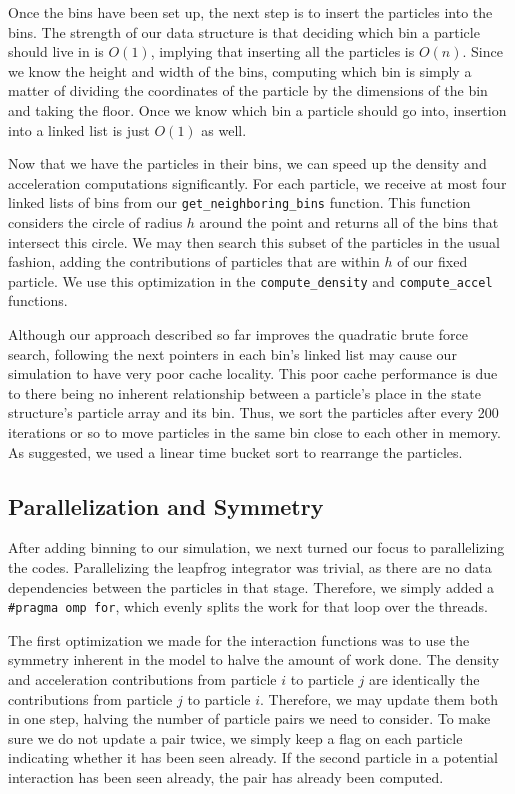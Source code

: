 \message{ !name(writeup.tex)}\documentclass[12pt]{article}
\def\ind{\vspace{0.75em}\noindent}
\begin{document}
\ind Once the bins have been set up, the next step is to insert the particles
into the bins. The strength of our data structure is that deciding which
bin a particle should live in is $O(1)$, implying that inserting all
the particles is $O(n)$. Since we know the height and width of the
bins, computing which bin is simply a matter of dividing the coordinates
of the particle by the dimensions of the bin and taking the floor.
Once we know which bin a particle should go into, insertion into a
linked list is just $O(1)$ as well.

\ind Now that we have the particles in their bins, we can speed up the
density and acceleration computations significantly. For each particle,
we receive at most four linked lists of bins from our {\tt get\_neighboring\_bins}
function. This function considers the circle of radius $h$ around the
point and returns all of the bins that intersect this circle. We
may then search this subset of the particles in the usual fashion,
adding the contributions of particles that are within $h$ of our
fixed particle. We use this optimization in the {\tt compute\_density}
and {\tt compute\_accel} functions.

\ind Although our approach described so far improves the quadratic
brute force search, following the next pointers in each bin's
linked list may cause our simulation to have very poor cache
locality. This poor cache performance is due to there being no
inherent relationship between a particle's place in the state structure's
particle array and its bin. Thus, we sort the particles after every
200 iterations or so to move particles in the same bin close to each
other in memory. As suggested, we used a linear time bucket
sort to rearrange the particles.

\subsection*{Parallelization and Symmetry}
After adding binning to our simulation, we next turned our focus to
parallelizing the codes. Parallelizing the leapfrog integrator was
trivial, as there are no data dependencies between the particles
in that stage. Therefore, we simply added a {\tt \#pragma omp for},
which evenly splits the work for that loop over the threads.

\ind The first optimization we made for the interaction functions
was to use the symmetry inherent in the model to halve the amount
of work done. The density and acceleration contributions from particle
$i$ to particle $j$ are identically the contributions from particle
$j$ to particle $i$. Therefore, we may update them both in
one step, halving the number of particle pairs we need to consider.
To make sure we do not update a pair twice, we simply keep a flag
on each particle indicating whether it has been seen already. If
the second particle in a potential interaction has been seen
already, the pair has already been computed.
\end{document}
